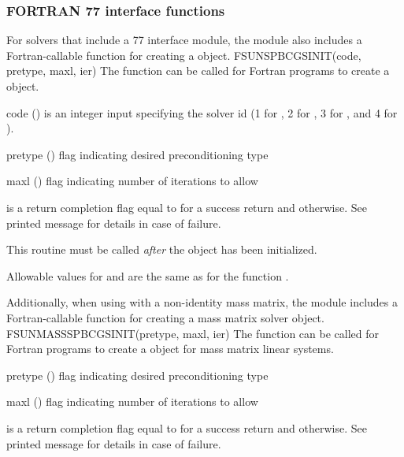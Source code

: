 \subsubsection*{FORTRAN 77 interface functions}
For solvers that include a {\F} 77 interface module, the
{\sunlinsolspbcgs} module also includes a Fortran-callable function
for creating a  object.
%
%
{
  FSUNSPBCGSINIT(code, pretype, maxl, ier)
}
{
  The function  can be called for Fortran programs
  to create a {\sunlinsolspbcgs} object.
}
{
  \begin{args}[pretype]
  \item[code] ()
    is an integer input specifying the solver id (1 for {\cvode}, 2
    for {\ida}, 3 for {\kinsol}, and 4 for {\arkode}).
  \item[pretype] ()
    flag indicating desired preconditioning type
  \item[maxl] ()
    flag indicating number of iterations to allow
  \end{args}
}
{
   is a return completion flag equal to  for a success
  return and  otherwise. See printed message for details in case
  of failure.
}
{
  This routine must be called \emph{after} the {\nvector} object has
  been initialized.

  Allowable values for  and  are the same as for
  the {\CC} function \newline {}.
}
Additionally, when using {\arkode} with a non-identity
mass matrix, the {\sunlinsolspbcgs} module includes a Fortran-callable
function for creating a  mass matrix solver
object.
%
%
{
  FSUNMASSSPBCGSINIT(pretype, maxl, ier)
}
{
  The function  can be called for Fortran programs
  to create a {\sunlinsolspbcgs} object for mass matrix linear systems.
}
{
  \begin{args}[pretype]
  \item[pretype] ()
    flag indicating desired preconditioning type
  \item[maxl] ()
    flag indicating number of iterations to allow
  \end{args}
}
{
   is a  return completion flag equal to  for a success
  return and  otherwise. See printed message for details in case
  of failure.
}
